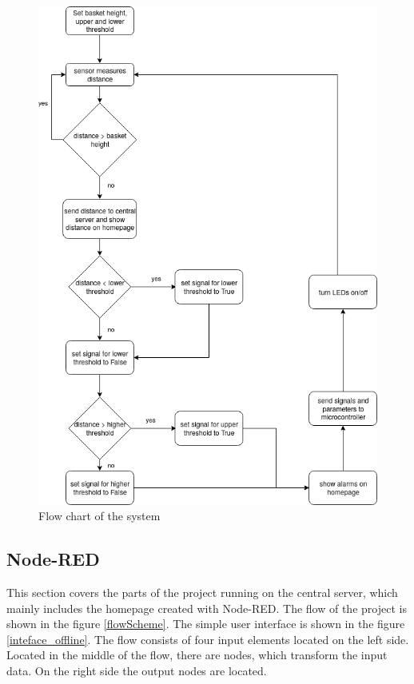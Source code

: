 \documentclass{article}
\begin{document}
\begin{figure}[]
		\center \includegraphics[scale=0.6]{flowChart.png}
		\caption{Flow chart of the system}
		\label{flowChart}
\end{figure}

\subsection{Node-RED}
This section covers the parts of the project running on the central server, which
mainly includes the homepage created with Node-RED. The flow of the project is shown in the figure \ref{flowScheme}. The simple user interface is shown in the figure \ref{inteface_offline}. The flow consists of four input elements located on the left side. Located in the middle of the flow, there are nodes, which transform the input data. On the right side the output nodes are located.\par
\end{document}
